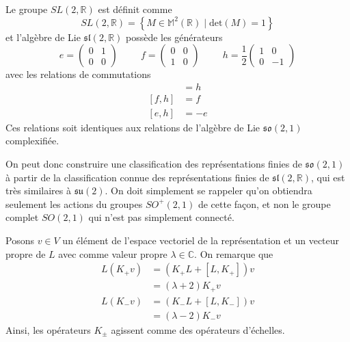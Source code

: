 \documentclass{article}
\numberwithin{equation}{section}
\theoremstyle{solution}
\begin{document}
Le groupe $SL(2, \mathbb{R})$ est définit comme
\begin{equation}
        SL(2, \mathbb{R}) = \left\{ M \in \mathbb{M}^{2}(\mathbb{R}) \mid \mathrm{det}(M) = 1 \right\}
\end{equation} 
et l'algèbre de Lie $\mathfrak{sl}(2, \mathbb{R})$ possède les générateurs
\begin{equation}
        e = 
        \begin{pmatrix}
                0 & 1 \\
                0 & 0
        \end{pmatrix}
        \hspace{1cm}
        f = 
        \begin{pmatrix}
                0 & 0 \\
                1 & 0
        \end{pmatrix}
        \hspace{1cm}
        h = 
        \frac{1}{2}
        \begin{pmatrix}
                1 & 0 \\
                0 & -1
        \end{pmatrix}
\end{equation} 
avec les relations de commutations
\begin{align}
        [e, f] &= h \\
        [f, h] &= f \\
        [e, h] &= -e
\end{align}
Ces relations soit identiques aux relations de l'algèbre de Lie $\mathfrak{so}(2, 1)$ complexifiée.

On peut donc construire une classification des représentations finies de $\mathfrak{so}(2, 1)$ à partir de la classification 
connue des représentations finies de $\mathfrak{sl}(2, \mathbb{R})$, qui est très similaires à $\mathfrak{su}(2)$. On doit simplement 
se rappeler qu'on obtiendra seulement les actions du groupes $SO^{+}(2, 1)$ de cette façon, et non le groupe complet 
$SO(2, 1)$ qui n'est pas simplement connecté.

Posons $v \in V$ un élément de l'espace vectoriel de la représentation et un vecteur propre de $L$ avec comme valeur propre $\lambda \in \mathbb{C}$.
On remarque que 
\begin{align*}
        L (K_{+} v) &=  (K_+ L  + [L, K_{+}])v \\
        &= (\lambda + 2) K_+ v \\
        L(K_{-} v) &=  (K_{-} L + [L, K_{-}])v \\
        &= (\lambda - 2)K_{-}v
\end{align*} 
Ainsi, les opérateurs $K_{\pm}$ agissent comme des opérateurs d'échelles. 
\end{document}
